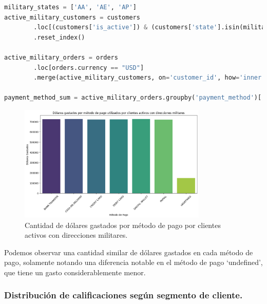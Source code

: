 \begin{lstlisting}[language=Python, xleftmargin=25pt, xrightmargin=25pt]
military_states = ['AA', 'AE', 'AP']
active_military_customers = customers
        .loc[(customers['is_active']) & (customers['state'].isin(military_states))]['customer_id']
        .reset_index()

active_military_orders = orders
        .loc[orders.currency == "USD"]
        .merge(active_military_customers, on='customer_id', how='inner')
        
payment_method_sum = active_military_orders.groupby('payment_method')['total_amount'].sum()
\end{lstlisting}

\begin{figure}[H]
    \centering
    \includegraphics[width=0.8\textwidth]{imagenes/consultas_propias/dolares_militares.png}
    \caption{Cantidad de dólares gastados por método de pago por clientes activos con direcciones militares.}
    \label{fig:dolares_militares}
\end{figure}

Podemos observar una cantidad similar de dólares gastados en cada método de pago, solamente notando una diferencia notable en el método de pago `undefined', que tiene un gasto considerablemente menor.

\subsubsection{Distribución de calificaciones según segmento de cliente.}

